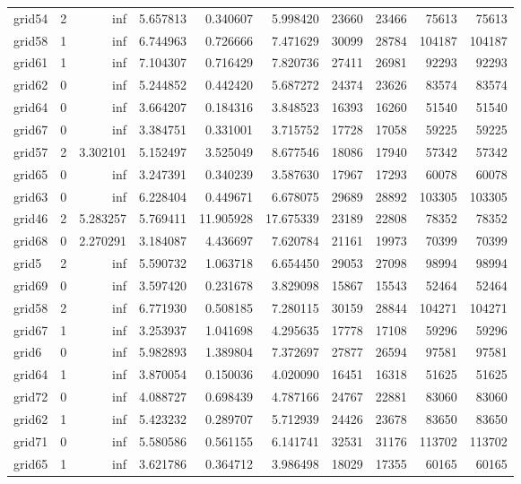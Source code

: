 \begin{longtable}{|l|r|r|r|r|r|r|r|r|r|}
grid54 & 2 & inf & 5.657813 & 0.340607 & 5.998420 & 23660 & 23466 & 75613 & 75613 \\
grid58 & 1 & inf & 6.744963 & 0.726666 & 7.471629 & 30099 & 28784 & 104187 & 104187 \\
grid61 & 1 & inf & 7.104307 & 0.716429 & 7.820736 & 27411 & 26981 & 92293 & 92293 \\
grid62 & 0 & inf & 5.244852 & 0.442420 & 5.687272 & 24374 & 23626 & 83574 & 83574 \\
grid64 & 0 & inf & 3.664207 & 0.184316 & 3.848523 & 16393 & 16260 & 51540 & 51540 \\
grid67 & 0 & inf & 3.384751 & 0.331001 & 3.715752 & 17728 & 17058 & 59225 & 59225 \\
grid57 & 2 & 3.302101 & 5.152497 & 3.525049 & 8.677546 & 18086 & 17940 & 57342 & 57342 \\
grid65 & 0 & inf & 3.247391 & 0.340239 & 3.587630 & 17967 & 17293 & 60078 & 60078 \\
grid63 & 0 & inf & 6.228404 & 0.449671 & 6.678075 & 29689 & 28892 & 103305 & 103305 \\
grid46 & 2 & 5.283257 & 5.769411 & 11.905928 & 17.675339 & 23189 & 22808 & 78352 & 78352 \\
grid68 & 0 & 2.270291 & 3.184087 & 4.436697 & 7.620784 & 21161 & 19973 & 70399 & 70399 \\
grid5 & 2 & inf & 5.590732 & 1.063718 & 6.654450 & 29053 & 27098 & 98994 & 98994 \\
grid69 & 0 & inf & 3.597420 & 0.231678 & 3.829098 & 15867 & 15543 & 52464 & 52464 \\
grid58 & 2 & inf & 6.771930 & 0.508185 & 7.280115 & 30159 & 28844 & 104271 & 104271 \\
grid67 & 1 & inf & 3.253937 & 1.041698 & 4.295635 & 17778 & 17108 & 59296 & 59296 \\
grid6 & 0 & inf & 5.982893 & 1.389804 & 7.372697 & 27877 & 26594 & 97581 & 97581 \\
grid64 & 1 & inf & 3.870054 & 0.150036 & 4.020090 & 16451 & 16318 & 51625 & 51625 \\
grid72 & 0 & inf & 4.088727 & 0.698439 & 4.787166 & 24767 & 22881 & 83060 & 83060 \\
grid62 & 1 & inf & 5.423232 & 0.289707 & 5.712939 & 24426 & 23678 & 83650 & 83650 \\
grid71 & 0 & inf & 5.580586 & 0.561155 & 6.141741 & 32531 & 31176 & 113702 & 113702 \\
grid65 & 1 & inf & 3.621786 & 0.364712 & 3.986498 & 18029 & 17355 & 60165 & 60165 \\

\end{longtable}
